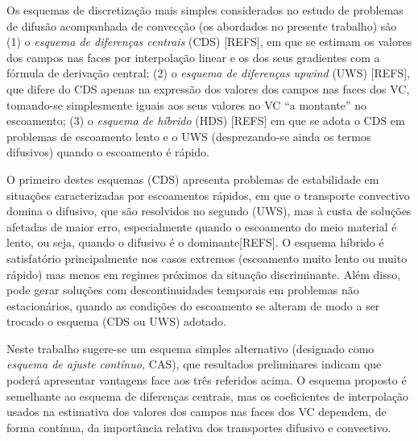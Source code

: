 \documentclass[11pt,twoside]{article}
\begin{document}
{Os esquemas de discretização mais simples considerados no estudo de problemas de
difusão acompanhada de convecção (os abordados no presente trabalho) são (1) o
\emph{esquema de diferenças centrais} (CDS) [REFS], em que se estimam os valores
dos campos nas faces por interpolação linear e os dos seus gradientes com a
fórmula de derivação central; (2) o \emph{esquema de diferenças upwind} (UWS)
[REFS], que difere do CDS apenas na expressão dos valores dos campos nas faces
dos  VC, tomando-se simplesmente iguais aos seus valores no VC ``a montante''
no escoamento; (3) o \emph{esquema de híbrido} (HDS) [REFS] em que se adota o
CDS em problemas de escoamento lento e o UWS (desprezando-se ainda os termos
difusivos) quando o escoamento é rápido.

O primeiro destes esquemas (CDS) apresenta problemas de estabilidade em
situações caracterizadas por escoamentos rápidos, em que o transporte convectivo
domina o difusivo, que são resolvidos no segundo (UWS), mas à custa de soluções
afetadas de maior erro, especialmente quando o escoamento do meio material é
lento, ou seja, quando o  difusivo é o dominante[REFS]. O esquema híbrido é
satisfatório principalmente nos casos extremos (escoamento muito lento ou muito
rápido) mas menos em regimes próximos da situação discriminante. Além disso,
pode gerar soluções com descontinuidades temporais em problemas não
estacionários, quando as condições do escoamento se alteram de modo a ser
trocado o esquema (CDS ou UWS) adotado.

Neste trabalho sugere-se um esquema simples alternativo (designado como
\emph{esquema de ajuste contínuo,} CAS), que resultados
preliminares indicam que poderá apresentar vantagens face aos três referidos
acima. O esquema  proposto é semelhante ao esquema de diferenças centrais, mas os
coeficientes de interpolação usados na estimativa dos valores dos campos nas
faces dos VC dependem, de forma contínua, da importância relativa dos
transportes difusivo e convectivo.

}
\end{document}
